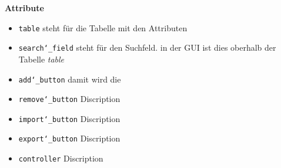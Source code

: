 \documentclass{article}
\begin{document}
\textbf{{Attribute}}
\begin{itemize}
\item \texttt{table} \newline steht für die Tabelle mit den Attributen
\item \texttt{search\char`_field} \newline steht für den Suchfeld. in der GUI ist dies oberhalb der Tabelle \textit{table}
\item \texttt{add\char`_button} \newline damit wird die 
\item \texttt{remove\char`_button} \newline Discription
\item \texttt{import\char`_button} \newline Discription
\item \texttt{export\char`_button} \newline Discription
\item \texttt{controller} \newline Discription
\end{itemize}
\end{document}
